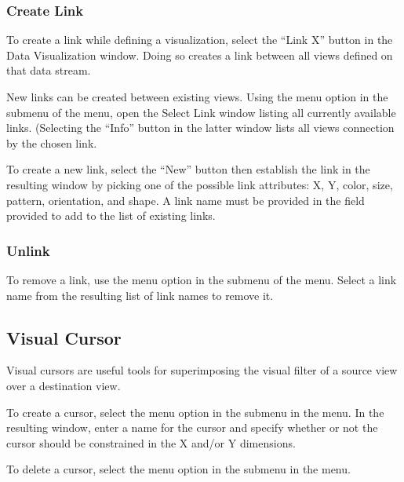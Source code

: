 \subsubsection{Create Link}

To create a link while defining a visualization, select the ``Link X'' button in
the Data Visualization window. Doing so creates a link between all views defined
on that data stream.

New links can be created between existing views. Using the  menu
option in the  submenu of the  menu, open the Select Link
window listing all currently available links. (Selecting the ``Info'' button in
the latter window lists all views connection by the chosen link.

To create a new link, select the ``New'' button then establish the link in the
resulting window by picking one of the possible link attributes: X, Y, color,
size, pattern, orientation, and shape. A link name must be provided in the field
provided to add to the list of existing links.

\subsubsection{Unlink}

To remove a link, use the  menu option in the  submenu
of the  menu. Select a link name from the resulting list of link names
to remove it.


\subsection{Visual Cursor}


Visual cursors are useful tools for superimposing the visual filter of a source
view over a destination view.

To create a cursor, select the  menu option in the 
submenu in the  menu. In the resulting window, enter a name for the
cursor and specify whether or not the cursor should be constrained in the X
and/or Y dimensions.

To delete a cursor, select the  menu option in the 
submenu in the  menu. 

